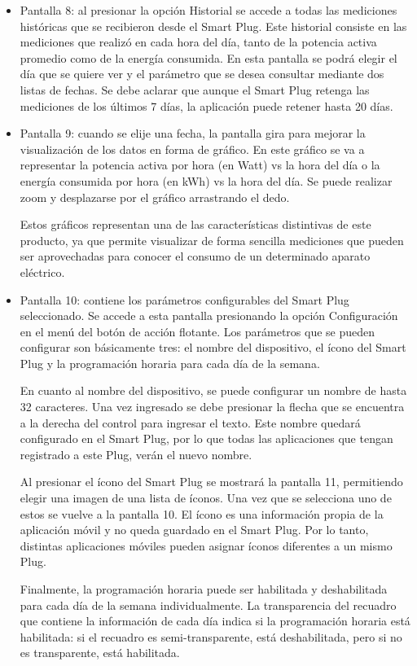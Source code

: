 \begin{itemize}
\item Pantalla 8: al presionar la opción Historial se accede a todas las mediciones históricas que se recibieron desde el Smart Plug. Este historial consiste en las mediciones que realizó en cada hora del día, tanto de la potencia activa promedio como de la energía consumida. En esta pantalla se podrá elegir el día que se quiere ver y el parámetro que se desea consultar mediante dos listas de fechas. Se debe aclarar que aunque el Smart Plug retenga las mediciones de los últimos 7 días, la aplicación puede retener hasta 20 días.

\item Pantalla 9: cuando se elije una fecha, la pantalla gira para mejorar la visualización de los datos en forma de gráfico. En este gráfico se va a representar la potencia activa por hora (en Watt) vs la hora del día o la energía consumida por hora (en kWh) vs la hora del día. Se puede realizar zoom y desplazarse por el gráfico arrastrando el dedo.

Estos gráficos representan una de las características distintivas de este producto, ya que permite visualizar de forma sencilla mediciones que pueden ser aprovechadas para conocer el consumo de un determinado aparato eléctrico.

\item Pantalla 10: contiene los parámetros configurables del Smart Plug seleccionado. Se accede a esta pantalla presionando la opción Configuración en el menú del botón de acción flotante. Los parámetros que se pueden configurar son básicamente tres: el nombre del dispositivo, el ícono del Smart Plug y la programación horaria para cada día de la semana.

En cuanto al nombre del dispositivo, se puede configurar un nombre de hasta 32 caracteres. Una vez ingresado se debe presionar la flecha que se encuentra a la derecha del control para ingresar el texto. Este nombre quedará configurado en el Smart Plug, por lo que todas las aplicaciones que tengan registrado a este Plug, verán el nuevo nombre.

Al presionar el ícono del Smart Plug se mostrará la pantalla 11, permitiendo elegir una imagen de una lista de íconos. Una vez que se selecciona uno de estos se vuelve a la pantalla 10. El ícono es una información propia de la aplicación móvil y no queda guardado en el Smart Plug. Por lo tanto, distintas aplicaciones móviles pueden asignar íconos diferentes a un mismo Plug.

Finalmente, la programación horaria puede ser habilitada y deshabilitada para cada día de la semana individualmente. La transparencia del recuadro que contiene la información de cada día indica si la programación horaria está habilitada: si el recuadro es semi-transparente, está deshabilitada, pero si no es transparente, está habilitada. 


\end{itemize}
